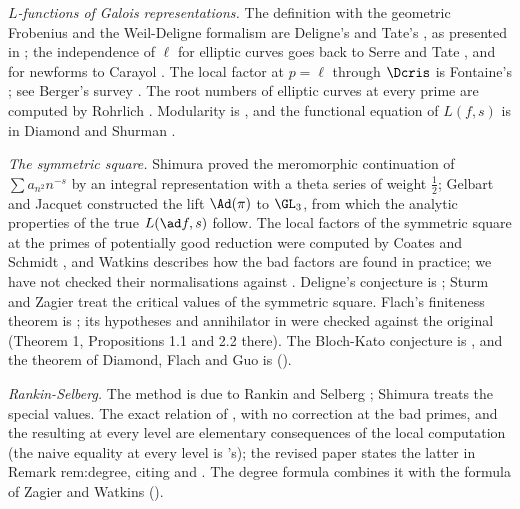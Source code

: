 \emph{$L$-functions of Galois representations.} The definition with the geometric Frobenius and the Weil-Deligne formalism are Deligne's \cite{Deligne73} and Tate's
\cite{Tate79}, as presented in ; the independence of $\ell$ for elliptic curves goes back to Serre and Tate \cite{SerreTate68}, and for newforms to Carayol
\cite{Carayol86}. The local factor at $p=\ell$ through $\Dcris$ is Fontaine's \cite{Fontaine}; see Berger's survey \cite{Berger}. The root numbers of elliptic curves at every prime
are computed by Rohrlich \cite{Rohrlich94}. Modularity is \cite{Wiles95,TaylorWiles,BCDT}, and the functional equation of $L(f,s)$ is in Diamond and Shurman
\cite[Section 5.10]{DiamondShurman}.

\emph{The symmetric square.} Shimura \cite{Shimura75} proved the meromorphic continuation of $\sum a_{n^2}n^{-s}$ by an integral representation with a theta series of weight
$\frac12$; Gelbart and Jacquet \cite{GelbartJacquet} constructed the lift $\Ad(\pi)$ to $\GL_3$, from which the analytic properties of the true $L(\ad f,s)$ follow. The local
factors of the symmetric square at the primes of potentially good reduction were computed by Coates and Schmidt \cite{CoatesSchmidt87}, and Watkins \cite{Watkins02}
describes how the bad factors are found in practice; we have not checked their normalisations against . Deligne's conjecture is
\cite{Deligne79}; Sturm \cite{Sturm80} and Zagier \cite{Zagier85} treat the critical values of the symmetric square. Flach's finiteness theorem is \cite[Theorem 1]{Flach92}; its
hypotheses and annihilator in  were checked against the original (Theorem 1, Propositions 1.1 and 2.2 there). The Bloch-Kato conjecture is \cite{BlochKato}, and the theorem of
Diamond, Flach and Guo is \cite{DFG04} ().

\emph{Rankin-Selberg.} The method is due to Rankin \cite{Rankin39} and Selberg \cite{Selberg40}; Shimura \cite{Shimura76} treats the special values. The exact relation of
, with no correction at the bad primes, and the resulting  at every level are elementary
consequences of the local computation (the naive equality at every level is 's); the revised paper states the latter in Remark rem:degree, citing \cite{Rankin39,Shimura76} and \cite[Lemma 2.12]{DFG04}. The degree formula
combines it with the formula of Zagier \cite{Zagier85} and Watkins \cite{Watkins02} ().

